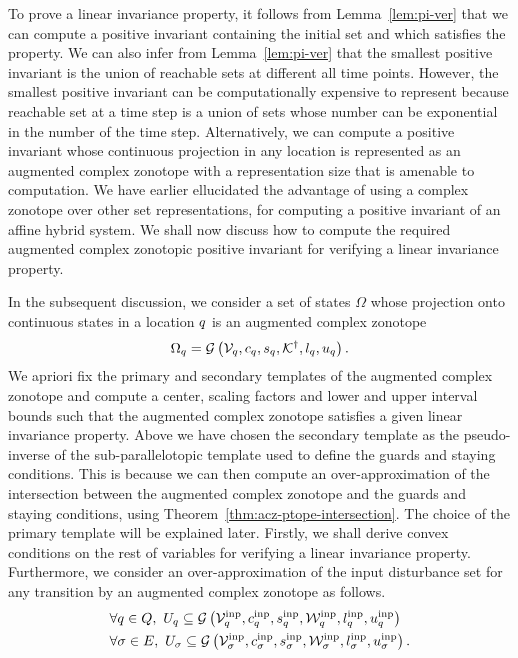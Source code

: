 To prove a linear invariance property, it follows from
Lemma~\ref{lem:pi-ver} that we can compute a positive invariant
containing the initial set and which satisfies the property.  We can
also infer from Lemma~\ref{lem:pi-ver} that the smallest positive
invariant is the union of reachable sets at different all time points.
However, the smallest positive invariant can be computationally
expensive to represent because reachable set at a time step is a union
of sets whose number can be exponential in the number of the time
step.  Alternatively, we can compute a positive invariant whose
continuous projection in any location is represented as an augmented
complex zonotope with a representation size that is amenable to
computation.  We have earlier ellucidated the advantage of using a
complex zonotope over other set representations, for computing a
positive invariant of an affine hybrid system.  We shall now discuss
how to compute the required augmented complex zonotopic positive
invariant for verifying a linear invariance property.

In the subsequent discussion, we consider a set of states $\Omega$ whose
projection onto continuous states in a location $q$ is an augmented
complex zonotope
%
\[
\Omega_q=\mathcal{G}\left(\mathcal{V}_q,c_q,s_q,{\mathcal{K}}^\dagger,l_q,u_q\right).
\]
%
We apriori fix the primary and secondary templates of the augmented
complex zonotope and compute a center, scaling factors and lower and
upper interval bounds such that the augmented complex zonotope
satisfies a given linear invariance property.  Above we have chosen
the secondary template as the pseudo-inverse of the sub-parallelotopic
template used to define the guards and staying conditions.  This is
because we can then compute an over-approximation of the intersection
between the augmented complex zonotope and the guards and staying
conditions, using Theorem~\ref{thm:acz-ptope-intersection}.  The choice
of the primary template will be explained later.  Firstly, we shall
derive convex conditions on the rest of variables for verifying a
linear invariance property.  Furthermore, we consider an
over-approximation of the input
disturbance set for any transition by an
augmented complex zonotope as follows.
%
\begin{align}
& \forall
q\in Q,~U_q\subseteq\mathcal{G}\left(\mathcal{V}^{\operatorname{inp}}_q,c^{\operatorname{inp}}_q,s^{\operatorname{inp}}_q,\mathcal{W}^{\operatorname{inp}}_q,l^{\operatorname{inp}}_q,u^{\operatorname{inp}}_q\right)\\
& \forall \sigma\in E,~U_\sigma\subseteq\mathcal{G}\left(\mathcal{V}^{\operatorname{inp}}_\sigma,c^{\operatorname{inp}}_\sigma,s^{\operatorname{inp}}_\sigma,\mathcal{W}^{\operatorname{inp}}_\sigma,l^{\operatorname{inp}}_\sigma,u^{\operatorname{inp}}_\sigma\right).
\end{align}
%

